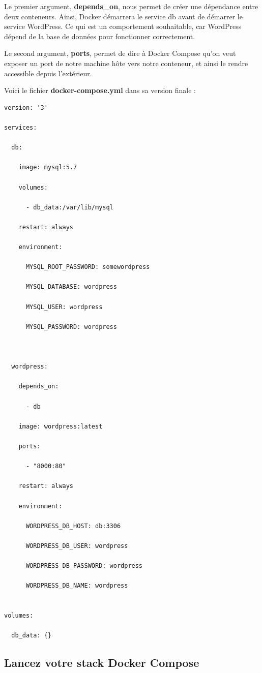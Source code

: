 \documentclass[12pt,a4paper]{article}
\begin{document}
Le premier argument, \textbf{depends\_on}, nous permet de créer une dépendance entre deux conteneurs. Ainsi, Docker démarrera le service db avant de démarrer le service WordPress. Ce qui est un comportement souhaitable, car WordPress dépend de la base de données pour fonctionner correctement.

Le second argument, \textbf{ports}, permet de dire à Docker Compose qu'on veut exposer un port de notre machine hôte vers notre conteneur, et ainsi le rendre accessible depuis l'extérieur.

Voici le fichier \textbf{docker-compose.yml} dans sa version finale :

\begin{verbatim}
version: '3'

services:

  db:

    image: mysql:5.7

    volumes:

      - db_data:/var/lib/mysql

    restart: always

    environment:

      MYSQL_ROOT_PASSWORD: somewordpress

      MYSQL_DATABASE: wordpress

      MYSQL_USER: wordpress

      MYSQL_PASSWORD: wordpress

    

  wordpress:

    depends_on:

      - db

    image: wordpress:latest

    ports:

      - "8000:80"

    restart: always

    environment:

      WORDPRESS_DB_HOST: db:3306

      WORDPRESS_DB_USER: wordpress

      WORDPRESS_DB_PASSWORD: wordpress

      WORDPRESS_DB_NAME: wordpress


volumes:

  db_data: {}
\end{verbatim}

\subsection{Lancez votre stack Docker Compose}
\end{document}
